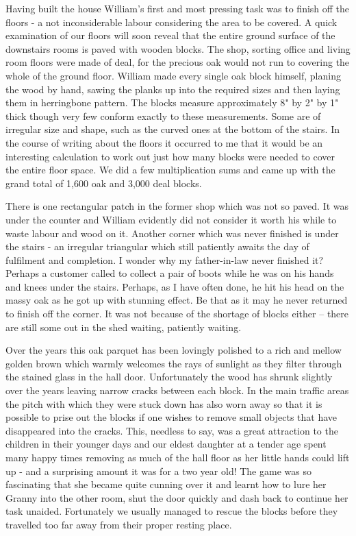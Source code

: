 
Having built the house William's first and most pressing task was to finish off the floors - a not inconsiderable labour considering the area to be covered. A quick examination of our floors will soon reveal that the entire ground surface of the downstairs rooms is paved with wooden blocks. The shop, sorting office and living room floors were made of deal, for the precious oak would not run to covering the whole of the ground floor. William made every single oak block himself, planing the wood by hand, sawing the planks up into the required sizes and then laying them in herringbone pattern. The blocks measure approximately 8" by 2" by 1" thick though very few conform exactly to these measurements. Some are of irregular size and shape, such as the curved ones at the bottom of the stairs. In the course of writing about the floors it occurred to me that it would be an interesting calculation to work out just how many blocks were needed to cover the entire floor space. We did a few multiplication sums and came up with the grand total of 1,600 oak and 3,000 deal blocks.

There is one rectangular patch in the former shop which was not so paved. It was under the counter and William evidently did not consider it worth his while to waste labour and wood on it. Another corner which was never finished is under the stairs - an irregular triangular which still patiently awaits the day of fulfilment and completion. I wonder why my father-in-law never finished it? Perhaps a customer called to collect a pair of boots while he was on his hands and knees under the stairs. Perhaps, as I have often done, he hit his head on the massy oak as he got up with stunning effect. Be that as it may he never returned to finish off the corner. It was not because of the shortage of blocks either – there are still some out in the shed waiting, patiently waiting.

Over the years this oak parquet has been lovingly polished to a rich and mellow golden brown which warmly welcomes the rays of sunlight as they filter through the stained glass in the hall door. Unfortunately the wood has shrunk slightly over the years leaving narrow cracks between each block. In the main traffic areas the pitch with which they were stuck down has also worn away so that it is possible to prise out the blocks if one wishes to remove small objects that have disappeared into the cracks. This, needless to say, was a great attraction to the children in their younger days and our eldest daughter at a tender age spent many happy times removing as much of the hall floor as her little hands could lift up - and a surprising amount it was for a two year old! The game was so fascinating that she became quite cunning over it and learnt how to lure her Granny into the other room, shut the door quickly and dash back to continue her task unaided. Fortunately we usually managed to rescue the blocks before they travelled too far away from their proper resting place. 

